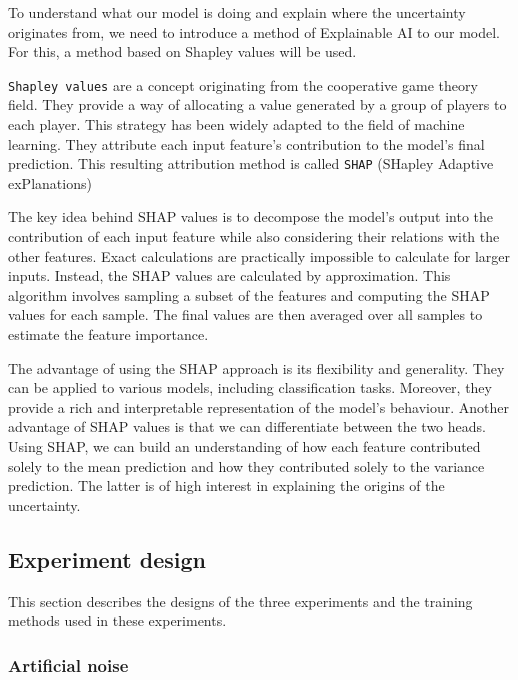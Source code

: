 To understand what our model is doing and explain where the uncertainty originates from, we need to introduce a method of Explainable AI to our model. For this, a method based on Shapley values will be used.

\verb|Shapley values| are a concept originating from the cooperative game theory field. They provide a way of allocating a value generated by a group of players to each player. This strategy has been widely adapted to the field of machine learning. They attribute each input feature's contribution to the model's final prediction. This resulting attribution method is called \verb|SHAP| (SHapley Adaptive exPlanations)

The key idea behind SHAP values is to decompose the model's output into the contribution of each input feature while also considering their relations with the other features. Exact calculations are practically impossible to calculate for larger inputs. Instead, the SHAP values are calculated by approximation. This algorithm involves sampling a subset of the features and computing the SHAP values for each sample. The final values are then averaged over all samples to estimate the feature importance.

The advantage of using the SHAP approach is its flexibility and generality. They can be applied to various models, including classification tasks. Moreover, they provide a rich and interpretable representation of the model's behaviour. Another advantage of SHAP values is that we can differentiate between the two heads. Using SHAP, we can build an understanding of how each feature contributed solely to the mean prediction and how they contributed solely to the variance prediction. The latter is of high interest in explaining the origins of the uncertainty. 

\subsection{Experiment design}

This section describes the designs of the three experiments and the training methods used in these experiments.

\subsubsection{Artificial noise}

